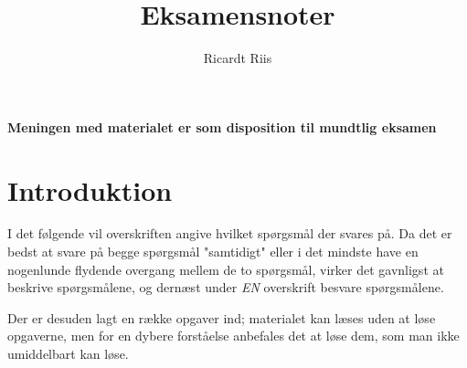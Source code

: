 \documentclass{article}
\title{Eksamensnoter}
\author{Ricardt Riis}
\begin{document}
\maketitle

\textbf{Meningen med materialet er som disposition til mundtlig eksamen}

\tableofcontents

\section*{Introduktion}
I det følgende vil overskriften angive hvilket spørgsmål der svares på. Da det
er bedst at svare på begge spørgsmål "samtidigt" eller i det mindste have en
nogenlunde flydende overgang mellem de to spørgsmål, virker det gavnligst at
beskrive spørgsmålene, og dernæst under \textit{EN} overskrift besvare
spørgsmålene.

Der er desuden lagt en række opgaver ind; materialet kan læses uden at løse
opgaverne, men for en dybere forståelse anbefales det at løse dem, som man ikke
umiddelbart kan løse.
\end{document}
